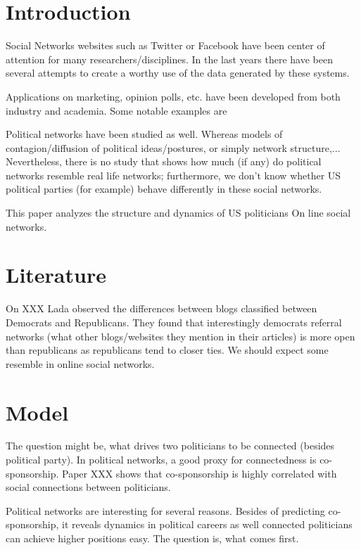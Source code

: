\documentclass[12]{article}
\begin{document}
\section{Introduction}

Social Networks websites such as Twitter or Facebook have been center of attention for many researchers/disciplines. In the last years there have been several attempts to create a worthy use of the data generated by these systems.

Applications on marketing, opinion polls, etc. have been developed from both industry and academia. Some notable examples are

Political networks have been studied as well. Whereas models of contagion/diffusion of political ideas/postures, or simply network structure,... Nevertheless, there is no study that shows how much (if any) do political networks resemble real life networks; furthermore, we don't know whether US political parties (for example) behave differently in these social networks.

This paper analyzes the structure and dynamics of US politicians On line social networks.

\section{Literature}

On XXX Lada observed the differences between blogs classified between Democrats and Republicans. They found that interestingly democrats referral networks (what other blogs/websites they mention in their articles) is more open than republicans as republicans tend to closer ties. We should expect some resemble in online social networks.

\section{Model}

The question might be, what drives two politicians to be connected (besides political party). In political networks, a good proxy for connectedness is co-sponsorship. Paper XXX shows that co-sponsorship is highly correlated with social connections between politicians.

Political networks are interesting for several reasons. Besides of predicting co-sponsorship, it reveals dynamics in political careers as well connected politicians can achieve higher positions easy. The question is, what comes first.
\end{document}
